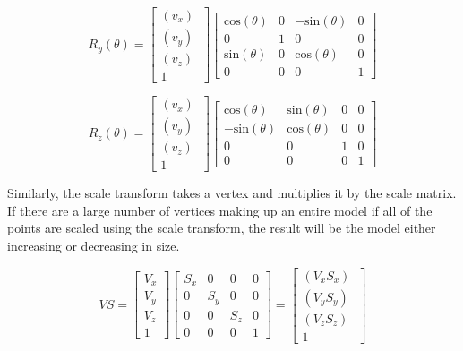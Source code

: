 \begin{equation}
R_y(\theta) = 
\begin{bmatrix}
(v_x)~ \\
(v_y)~ \\
(v_z)~ \\
1
\end{bmatrix}
\begin{bmatrix}
\text{cos}(\theta) 	& 0 					& -\text{sin}(\theta) 	& 0\\
0 					& 1						& 0						& 0\\
\text{sin}(\theta) 	& 0 					& \text{cos}(\theta)	& 0\\
0 					& 0 					& 0 					& 1
\end{bmatrix}
\end{equation}

\begin{equation}
R_z(\theta) = 
\begin{bmatrix}
(v_x)~ \\
(v_y)~ \\
(v_z)~ \\
1
\end{bmatrix}
\begin{bmatrix}
\text{cos}(\theta) 	& \text{sin}(\theta) 	& 0						& 0\\
-\text{sin}(\theta) & \text{cos}(\theta) 	& 0
					& 0\\
0 					& 0 					& 1						& 0\\
0 					& 0 					& 0 					& 1
\end{bmatrix}
\end{equation}

\noindent
Similarly, the scale transform takes a vertex and multiplies it by the scale matrix. If there are a large number of vertices making up an entire model if all of the points are scaled using the scale transform, the result will be the model either increasing or decreasing in size.

\begin{equation}
VS = \begin{bmatrix}
V_{x} \\
V_{y} \\
V_{z} \\
1
\end{bmatrix}
\begin{bmatrix}
S_x & 0 & 0 & 0\\
0 & S_y & 0 & 0\\
0 & 0 & S_z & 0\\
0  & 0  & 0 & 1
\end{bmatrix}
= \begin{bmatrix}
(V_x S_x)~ \\
(V_y S_y)~ \\
(V_z S_z)~ \\
1
\end{bmatrix}
\end{equation}

